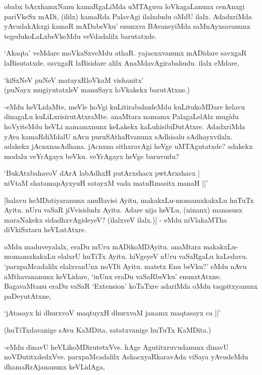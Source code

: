 obabx bArxhamxNanu kamaRgaLiMda uMTAguva loVkagaLanunx cenAnxgi pariVkeSx mADi, (ililx) kamaRda PalavAgi ilalxdudu oMdU ilalx. AdadxriMda yAvudakAkxgi kamaR mADabeVku' enunxva BAvaneyiMda saMnAyxsavanunx tegedukoLaLxbeVkeMdu veVdadalilx barutatxde.

`Akaqta' veMdare moVkaSxveMdu athaR. yajacnxvanunx mADidare savxgaR laBisutatxde. savxgaR laBisidare alilx AnaMdavAgirabahudu. ilalx eMdare,

\begin{shloka}
`kiSxNeV puNeV matayxRloVkaM vishanitx'\\
(puNayx mugiyutatxleV manuSayx loVkakekx barutAtxne.)
\end{shloka}

-eMdu heVLidaMte, meVle hoVgi kuLitirabahudeMdu kuLitukoMDare kelavu dinagaLu kuLiLxrisirutAtxraMte. anaMtara namamx PalagaLelAlx mugidu hoVyiteMdu heVLi namamxnunx keLakekx kaLuhisibiDutAtxre. AdadxriMda yAva kamaRdiMdalU nAvu puruSAthaRvanunx sAdhisalu sAdhayxvilalx. adakekx jAcnxnasAdhana. jAcnxna sithxravAgi heVge uMTAgutatxde? adakekx modalu veYrAgayx beVku. veYrAgayx heVge baruvudu?

\begin{shloka}
`BukAtxbahavoV dArA labAdhxH putArxshacx pwtArxshacx |\\
niVtaM shatamapAyxyuH satayxM vada matuRmasitx manaH ||'
\end{shloka}

[halavu heMDatiyaranunx anuBavisi Ayitu, makakxLu-momamxkakxLu huTuTx Ayitu. nUru vaSaR jiVvisidudx Ayitu. Adare nija heVLu, (ninanx) manasusx maraNakekx sidadhxvAgideyeV? (ilalxveV ilalx.)] - eMdu niVlakaMTha diVkiSxtaru heVLutAtxre.

oMdu maduveyalalx, eraDu mUru mADikoMDAyitu. anaMtara makakxLu-momamxkakxLu elalxrU huTiTx Ayitu. hiVgeyeV nUru vaSaRgaLu kaLedavu. `parxpaMcadalilx elalxvanUnx noVDi Ayitu. matetx Enu beVku?' eMdu nAvu aMthavananunx keVLidare, `inUnx eraDu vaSaRbeVku' enunxtAtxne. BagavaMtanu eraDu vaSaR `{\eng Extension}' koTaTxre adariMda oMdu taqpitxyanunx paDeyutAtxne,

\begin{shloka}
`jAtasayx hi dhurxvoV maqtuyxH dhurxvaM janamx maqtasayx ca ||'
\end{shloka}

(huTiTxdavanige sAvu KaMDita, satatxvanige huTuTx KaMDita.)

-eMdu dinavU heVLikoMDirutetxVve. hAge Agutitxruvudanunx dinavU noVDutitxdedxVve. parxpaMcadalilx AshacxyaRkaravAda viSaya yAvudeMdu dhamaRrAjananunx keVLidAga,


